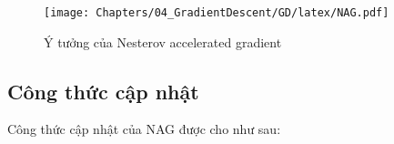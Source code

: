 \begin{figure}[t]
\centering
\texttt{[image: Chapters/04\_GradientDescent/GD/latex/NAG.pdf]}
\caption[]{Ý tưởng của Nesterov accelerated gradient}
\label{fig:8_mynag}
\end{figure}





\subsection{Công thức cập nhật}

Công thức cập nhật của NAG được cho như sau:



